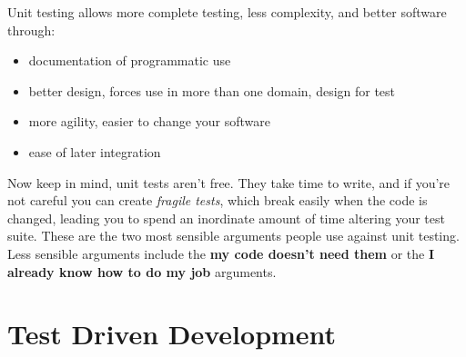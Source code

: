 \documentclass[t, 10pt]{beamer}
\begin{document}
\begin{frame}
Unit testing allows more complete testing, less complexity, and better software through:
\begin{itemize}
\item documentation of programmatic use
\item better design, forces use in more than one domain, design for test
\item more agility, easier to change your software
\item ease of later integration
\end{itemize}
Now keep in mind, unit tests aren't free.
\newline
\newline
\pause
They take time to write, and if you're not careful you can create \textit{fragile tests}, which break easily when the code is changed, leading you to spend an inordinate amount of time altering your test suite.  These are the two most sensible arguments people use against unit testing.  Less sensible arguments include the \textbf{my code doesn't need them} or the \textbf{I already know how to do my job} arguments.
\end{frame}

\section{Test Driven Development}

\begin{frame}
\frametitle{}
\end{frame}


\begin{frame}
\frametitle{}
\end{frame}
\end{document}

